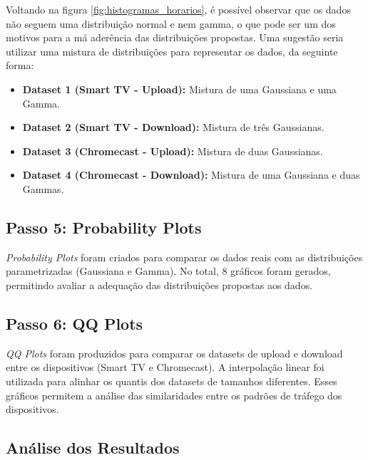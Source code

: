 Voltando na figura \ref{fig:histogramas_horarios}, é possível observar que os dados não seguem uma distribuição normal e nem gamma, o que pode ser um dos motivos para a má aderência das distribuições propostas. Uma sugestão seria utilizar uma mistura de distribuições para representar os dados, da seguinte forma:

\begin{itemize}
    \item \textbf{Dataset 1 (Smart TV - Upload):} Mistura de uma Gaussiana e uma Gamma.
    \item \textbf{Dataset 2 (Smart TV - Download):} Mistura de três Gaussianas.
    \item \textbf{Dataset 3 (Chromecast - Upload):} Mistura de duas Gaussianas.
    \item \textbf{Dataset 4 (Chromecast - Download):} Mistura de uma Gaussiana e duas Gammas.
\end{itemize}



\subsection{Passo 5: Probability Plots}

\textit{Probability Plots} foram criados para comparar os dados reais com as distribuições parametrizadas (Gaussiana e Gamma). No total, 8 gráficos foram gerados, permitindo avaliar a adequação das distribuições propostas aos dados.

\subsection{Passo 6: QQ Plots}

\textit{QQ Plots} foram produzidos para comparar os datasets de upload e download entre os dispositivos (Smart TV e Chromecast). A interpolação linear foi utilizada para alinhar os quantis dos datasets de tamanhos diferentes. Esses gráficos permitem a análise das similaridades entre os padrões de tráfego dos dispositivos.

\subsection{Análise dos Resultados}


